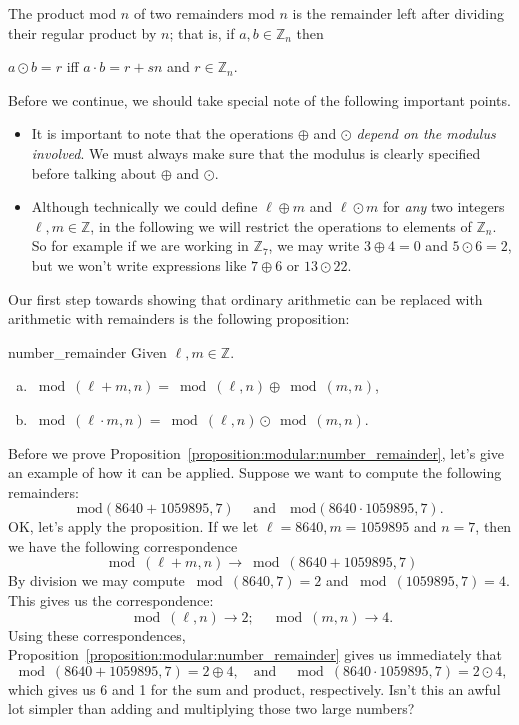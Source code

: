 \begin{defn}\label{definition:modular:mod_mult}

\noindent
The product mod $n$ of two remainders mod $n$ is the remainder left after dividing their regular product by $n$; that is, if $a,b \in {\mathbb Z}_n$ then

\begin{center}
$a \odot b = r$ iff  $a \cdot b = r + sn$ and 
$r \in {\mathbb Z}_n.$
\end{center}
\end{defn}
Before we continue, we should take special note of the following important points.

\begin{rem}
\begin{itemize}
\item
It is important to note that the operations $\oplus$ and $\odot$ \emph{depend on the modulus involved}. We must always make sure that the modulus is clearly specified before talking about $\oplus$ and $\odot$.
\item
Although technically we could define $\ell \oplus m$ and $\ell \odot m$ for \emph{any} two integers $\ell,m \in \mathbb{Z}$, in the following we will restrict the operations to elements of  $ \mathbb{Z}_n$.  So for example  if we are working in $\mathbb{Z}_7$, we may write $3 \oplus 4 = 0$ and $5 \odot 6 = 2$, but we won't write expressions like $7 \oplus 6$ or $13 \odot 22$.
\end{itemize}
\end{rem}

Our first step towards showing that ordinary arithmetic can be replaced with arithmetic with remainders is the following proposition:

\begin{prop}{number_remainder}
Given $\ell,m \in {\mathbb Z}$. 
\begin{enumerate}[(a)]
\item
$\bmod(\ell+ m,n) = \bmod(\ell,n) \oplus \bmod(m,n)$, 
\item
$\bmod(\ell \cdot m,n) = \bmod(\ell,n) \odot \bmod(m,n)$.
\end{enumerate}
\end{prop}

Before we prove Proposition~\ref{proposition:modular:number_remainder}, let's give an example of how it can be applied. Suppose we want to compute the following remainders: 
\[
\text{mod}(8640 + 1059895,7) \quad \text{ and} \quad  \text{mod}(8640 \cdot 1059895, 7).
\]  
OK, let's apply the proposition. If we let $\ell=8640, m=1059895$ and $n=7$, then we have the following correspondence
\[ \bmod(\ell+ m,n) \rightarrow \bmod(8640 + 1059895,7) \]
By division we may compute $\bmod(8640,7)=2$ and $\bmod(1059895,7)=4$. This gives us the correspondence:
\[  \bmod(\ell,n) \rightarrow 2; \quad \bmod(m,n) \rightarrow 4. \]
Using these correspondences,  Proposition~\ref{proposition:modular:number_remainder} gives us immediately that
\[
\bmod(8640+ 1059895,7) = 2 \oplus 4 , \quad \text{and} \quad \bmod(8640 \cdot 1059895,7) = 2 \odot 4,
\]
which gives us 6 and 1  for the sum and product, respectively.  Isn't this  an awful lot simpler than adding and multiplying those two large numbers?

